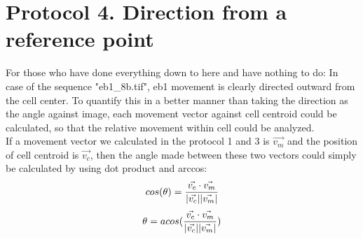 \documentclass[11pnt]{article}
\begin{document}
\section{Protocol 4. Direction from a reference point}

For those who have done everything down to here and have nothing to do: In case of the sequence "eb1\_8b.tif", eb1 movement is clearly directed outward from the cell center. To quantify this in a better manner than taking the direction as the angle against image, each movement vector against cell centroid could be calculated, so that the relative movement within cell could be analyzed. 
\\
If a movement vector we calculated in the protocol 1 and 3 is \(\vec{v_{m}}\) and the position of cell centroid is \(\vec{v_c}\), then the angle made between these two vectors could simply be calculated by using dot product and arccos:
\[
cos(\theta) = \frac{\vec{v_c} \cdot \vec{v_m}}{|\vec{v_c}||\vec{v_m}|}\\
\]
\[
\theta = acos(\frac{\vec{v_c} \cdot \vec{v_m}}{|\vec{v_c}||\vec{v_m}|})\\
\]



\end{document}

